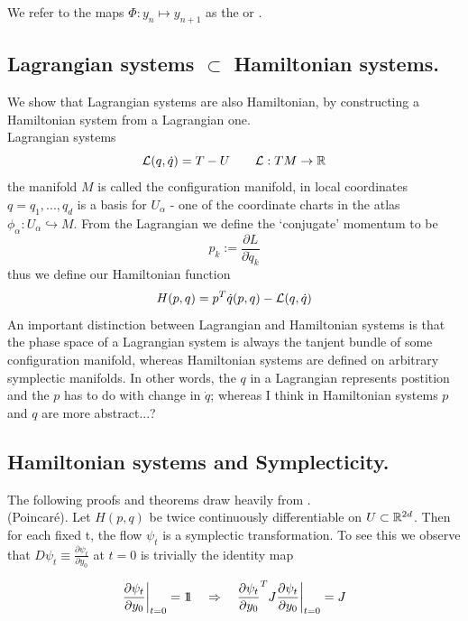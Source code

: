 \documentclass[12pt]{article}
\begin{document}
We refer to the maps $\Phi : y_n\mapsto y_{n+1}$ as the  or . 

\subsection{Lagrangian systems $\subset$ Hamiltonian systems.}
We show that Lagrangian systems are also Hamiltonian, by constructing a Hamiltonian system from a Lagrangian one. \\

Lagrangian systems
$$
\mathcal L(q,\dot q) = T - U\qquad \mathcal L : TM \to \mathbb{R}
$$
the manifold $M$ is called the configuration manifold, in local coordinates $q = q_1,...,q_d$ is a basis for $U_\alpha$ - one of the coordinate charts in the atlas $\phi_\alpha : U_\alpha\hookrightarrow M$. From the Lagrangian we define the `conjugate' momentum to be
$$
p_k := \frac{\partial L}{\partial \dot q_k}
$$
thus we define our Hamiltonian function 
$$
H(p,q) = p^T\dot q(p,q) - \mathcal L(q,\dot q)
$$
An important distinction between Lagrangian and Hamiltonian systems is that the phase space of a Lagrangian system is always the tanjent bundle of some configuration manifold, whereas Hamiltonian systems are defined on arbitrary symplectic manifolds. In other words, the $q$ in a Lagrangian represents postition and the $p$ has to do with change in $\dot q$; whereas I think in Hamiltonian systems $p$ and $q$ are more abstract...?


\subsection{Hamiltonian systems and Symplecticity.}

The following proofs and theorems draw heavily from \cite{Numerical}.\\ 

 (Poincar\'e). Let $H(p,q)$ be twice continuously differentiable on $U\subset \mathbb{R}^{2d}$. Then for each fixed t, the flow $\psi_t$ is a symplectic transformation. To see this we observe that $D\psi_t \equiv \frac{\partial \psi_t}{\partial y_0}$ at $t=0$ is trivially the identity map

\begin{equation}\label{eq:time flow jacobian at t=0}
\frac{\partial \psi_t}{\partial y_0}\bigg|_{t=0} = 1\!\!1 \quad\Rightarrow\quad \frac{\partial \psi_t}{\partial y_0}^T J \frac{\partial \psi_t}{\partial y_0}\bigg|_{t=0} = J
\end{equation}
\end{document}
